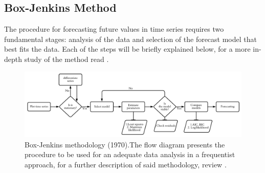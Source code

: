\subsection{Box-Jenkins Method}
The procedure for forecasting future values in time series requires two fundamental stages: analysis of the data and selection of the forecast model that best fits the data. Each of the steps will be briefly explained below, for a more in-depth study of the method read \citet{metodobox}.
%
\begin{figure}[!h]
	\centering
	\includegraphics[scale=0.55]{Figs/BJ4}
	\caption{Box-Jenkins methodology (1970).The flow diagram presents the procedure to be used for an adequate data analysis in a frequentist approach, for a further description of said methodology, review \cite{box}.}
	\label{fig:Box}
\end{figure}
%
